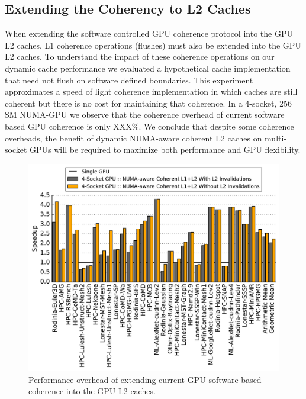 

\subsection{Extending the Coherency to L2 Caches}


When extending the software controlled GPU coherence protocol into the GPU L2 caches,
L1 coherence operations (flushes) must also be extended into the GPU L2 caches.  To understand
the impact of these coherence operations on our dynamic cache performance we evaluated a hypothetical
cache implementation that need not flush on software defined boundaries.  This experiment
approximates a speed of light coherence implementation in which caches are still coherent but
there is no cost for maintaining that coherence.  In a 4-socket, 256 SM NUMA-GPU we observe
that the coherence overhead of current software based GPU coherence is only XXX\%.  We conclude
that despite some coherence overheads, the benefit of dynamic NUMA-aware coherent L2 caches
on multi-socket GPUs will be required to maximize both performance and GPU flexibility.

\begin{figure}[t]
    \centering
    \includegraphics[width=1.0\columnwidth]{figures/plot_no_inval_WB.pdf}
    \caption{Performance overhead of extending current GPU software based coherence
    into the GPU L2 caches.}
    \label{fig:invalidations}
\end{figure}
